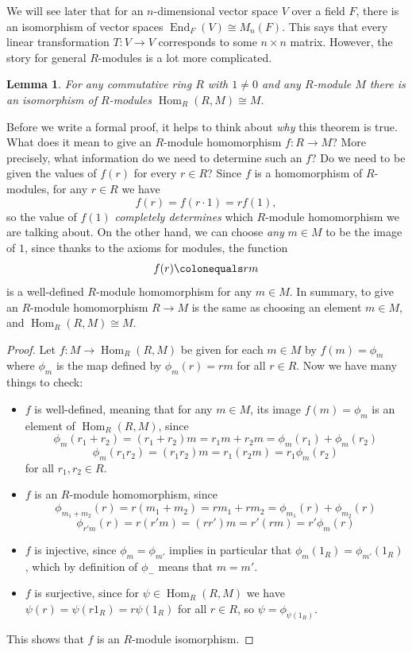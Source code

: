 \documentclass[12pt]{report}
\newtheorem{lemma}[theorem]{Lemma}
\numberwithin{equation}{section}
\numberwithin{theorem}{chapter}
\theoremstyle{definition}
\newtheorem*{basic properties}{Basic Properties}
\newtheorem*{Important Remark}{Important Remark}
\DeclareMathOperator{\End}{End}
\DeclareMathOperator{\Hom}{Hom}
\begin{document}
We will see later that for an $n$-dimensional vector space $V$ over a field $F$, there is an isomorphism of vector spaces $\End_F(V)\cong M_n(F)$. This says that every linear transformation $T:V\to V$ corresponds to some $n\times n$ matrix. However, the story for general $R$-modules is a lot more complicated.







\begin{lemma} 
For any commutative ring $R$ with $1\neq 0$ and any $R$-module $M$ there is an isomorphism of $R$-modules $\Hom_R(R,M)\cong M$. 
\end{lemma}


Before we write a formal proof, it helps to think about \emph{why} this theorem is true. What does it mean to give an $R$-module homomorphism $f\!: R \to M$? More precisely, what information do we need to determine such an $f$? Do we need to be given the values of $f(r)$ for every $r \in R$? Since $f$ is a homomorphism of $R$-modules, for any $r \in R$ we have
$$f(r) = f(r \cdot 1) = rf(1),$$
so the value of $f(1)$ \emph{completely determines} which $R$-module homomorphism we are talking about. On the other hand, we can choose \emph{any} $m \in M$ to be the image of $1$, since thanks to the axioms for modules, the function
$$f(r) \colonequals rm$$
is a well-defined $R$-module homomorphism for any $m \in M$. In summary, to give an $R$-module homomorphism $R \to M$ is the same as choosing an element $m \in M$, and $\Hom_R(R,M)\cong M$.


\begin{proof}
Let $f\!:M\to \Hom_R(R,M)$ be given for each $m\in M$ by $f(m)=\phi_m$ where $\phi_m$ is the map defined by $\phi_m(r)=rm$ for all $r\in R$. Now we have many things to check:
\begin{itemize}[leftmargin=12pt]
\item $f$ is well-defined, meaning that for any $m\in M$, its image $f(m) = \phi_m$ is an element of $\Hom_R(R,M)$, since 
$$\phi_m(r_1+r_2)=(r_1+r_2)m=r_1m+r_2m=\phi_m(r_1)+\phi_m(r_2)$$
$$\phi_m(r_1r_2)=(r_1r_2)m=r_1(r_2m)=r_1\phi_m(r_2)$$
for all $r_1,r_2\in R$.
\item $f$ is an $R$-module homomorphism, since
$$\phi_{m_1+m_2}(r)=r(m_1+m_2)=rm_1+rm_2=\phi_{m_1}(r)+\phi_{m_2}(r)$$
$$\phi_{r'm}(r)=r(r'm)=(rr')m=r'(rm)=r'\phi_{m}(r)$$
\item $f$ is injective, since $\phi_m=\phi_{m'}$ implies in particular that $\phi_m(1_R)=\phi_{m'}(1_R)$, which by definition of $\phi_{-}$ means that $m=m'$.
\item $f$ is surjective, since for $\psi \in \Hom_R(R,M)$ we have $\psi(r)=\psi(r1_R)=r\psi(1_R)$ for all $r\in R$, so $\psi=\phi_{\psi(1_R)}$.
\end{itemize}
This shows that $f$ is an $R$-module isomorphism.
\end{proof}
\end{document}
